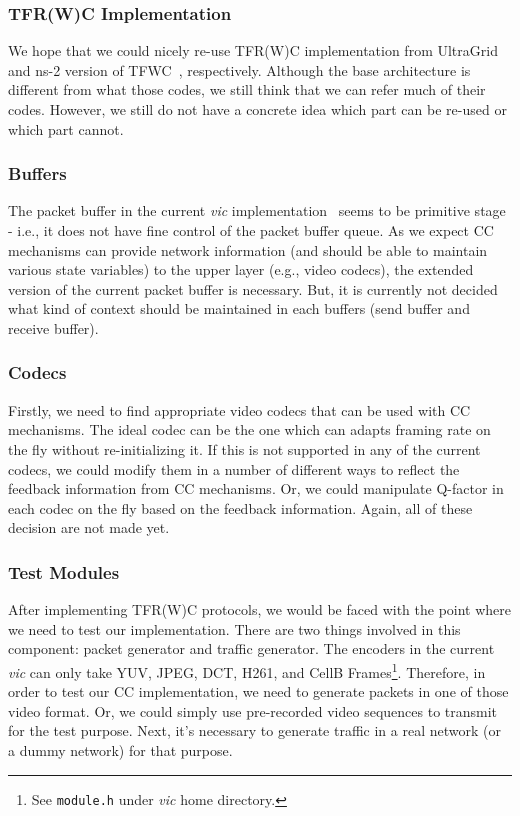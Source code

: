 \subsubsection{\label{sssec:aim:cc}TFR(W)C Implementation}

We hope that we could nicely re-use TFR(W)C implementation from
UltraGrid~\cite{UltraGrid} and ns-2 version of TFWC~\cite{SH06}, respectively.
Although the base architecture is different from what those codes, we still
think that we can refer much of their codes. However, we still do not have a
concrete idea which part can be re-used or which part cannot.

\subsubsection{\label{sssec:aim:buffers}Buffers}

The packet buffer in the current \emph{vic} implementation~\cite{AVATS} seems to be
primitive stage - i.e., it does not have fine control of the packet buffer
queue.  As we expect CC mechanisms can provide network information (and should
be able to maintain various state variables) to the upper layer (e.g., video
codecs), the extended version of the current packet buffer is necessary. But, it
is currently not decided what kind of context should be maintained in each
buffers (send buffer and receive buffer).

\subsubsection{\label{sssec:aim:codecs}Codecs}

Firstly, we need to find appropriate video codecs that can be used with CC
mechanisms. The ideal codec can be the one which can adapts framing rate on the
fly without re-initializing it. If this is not supported in any of the current
codecs, we could modify them in a number of different ways to reflect the
feedback information from CC mechanisms. Or, we could manipulate Q-factor in
each codec on the fly based on the feedback information. Again, all of these
decision are not made yet.

\subsubsection{\label{sssec:aim:test}Test Modules}

After implementing TFR(W)C protocols, we would be faced with the point where we
need to test our implementation. There are two things involved in this
component: packet generator and traffic generator. The encoders in the current
\emph{vic} can only take YUV, JPEG, DCT, H261, and CellB Frames\footnote{See
\texttt{module.h} under \emph{vic} home directory.}. Therefore, in order to test our CC
implementation, we need to generate packets in one of those video format. Or, we
could simply use pre-recorded video sequences to transmit for the test purpose.
Next, it's necessary to generate traffic in a real network (or a dummy network)
for that purpose.

